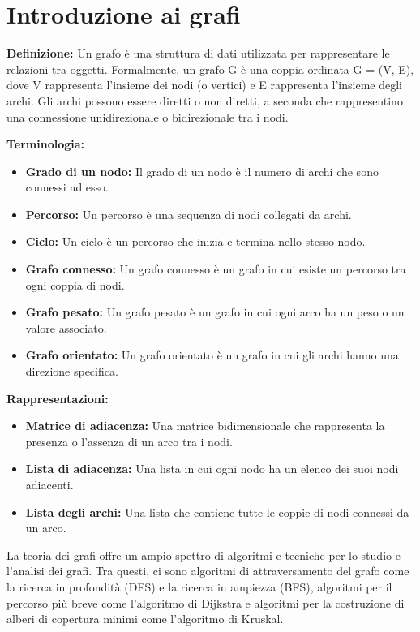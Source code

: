 \chapter{Introduzione ai grafi}

\textbf{Definizione:} Un grafo è una struttura di dati utilizzata per rappresentare le relazioni tra oggetti. Formalmente, un grafo G è una coppia ordinata G = (V, E), dove V rappresenta l'insieme dei nodi (o vertici) e E rappresenta l'insieme degli archi. Gli archi possono essere diretti o non diretti, a seconda che rappresentino una connessione unidirezionale o bidirezionale tra i nodi.

\textbf{Terminologia:}
\begin{itemize}
  \item \textbf{Grado di un nodo:} Il grado di un nodo è il numero di archi che sono connessi ad esso.
  \item \textbf{Percorso:} Un percorso è una sequenza di nodi collegati da archi.
  \item \textbf{Ciclo:} Un ciclo è un percorso che inizia e termina nello stesso nodo.
  \item \textbf{Grafo connesso:} Un grafo connesso è un grafo in cui esiste un percorso tra ogni coppia di nodi.
  \item \textbf{Grafo pesato:} Un grafo pesato è un grafo in cui ogni arco ha un peso o un valore associato.
  \item \textbf{Grafo orientato:} Un grafo orientato è un grafo in cui gli archi hanno una direzione specifica.
\end{itemize}

\textbf{Rappresentazioni:}
\begin{itemize}
  \item \textbf{Matrice di adiacenza:} Una matrice bidimensionale che rappresenta la presenza o l'assenza di un arco tra i nodi.
  \item \textbf{Lista di adiacenza:} Una lista in cui ogni nodo ha un elenco dei suoi nodi adiacenti.
  \item \textbf{Lista degli archi:} Una lista che contiene tutte le coppie di nodi connessi da un arco.
\end{itemize}

La teoria dei grafi offre un ampio spettro di algoritmi e tecniche per lo studio e l'analisi dei grafi. Tra questi, ci sono algoritmi di attraversamento del grafo come la ricerca in profondità (DFS) e la ricerca in ampiezza (BFS), algoritmi per il percorso più breve come l'algoritmo di Dijkstra e algoritmi per la costruzione di alberi di copertura minimi come l'algoritmo di Kruskal.

